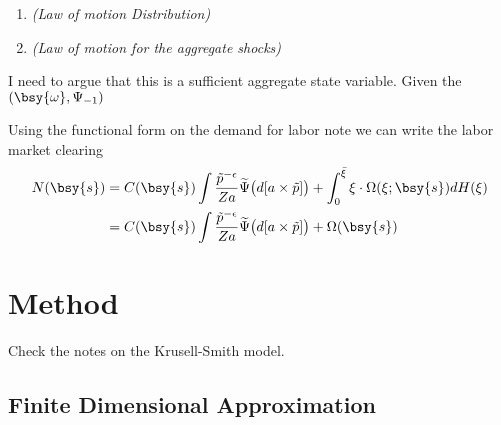 \documentclass[a4paper,10pt]{article}  %
\begin{document}
\begin{equil}
\begin{enumerate}
   \item \emph{(Law of motion Distribution)}

   
   \item \emph{(Law of motion for the aggregate shocks)}
\end{enumerate}
\end{equil} \normalsize

I need to argue that this is a sufficient aggregate state variable. Given the $ (\bsy{\omega}, \Psi_{-1} ) $ 

Using the functional form on the demand for labor note we can write the labor market clearing
\begin{equation}
   \label{eq:labor_market02}
   \begin{split}
      N(\bsy{s}) & = C(\bsy{s}) \int \frac{ \tilde{p}^{-\epsilon} }{Za} \widetilde{\Psi}\big( d[a \times \tilde{p}] \big) + 
             \int_0^{ \bar{\xi} } \xi \cdot \Omega(\xi; \bsy{s} ) dH(\xi) \\
      & = C(\bsy{s}) \int \frac{ \tilde{p}^{-\epsilon} }{Za} \widetilde{\Psi}\big( d[a \times \tilde{p}] \big) + \Omega(\bsy{s})
   \end{split}
\end{equation}



\newpage 
\section{Method} %
\label{sec:method}

Check the notes on the Krusell-Smith model.

\subsection{Finite Dimensional Approximation} %
\label{sub:finite_dimensional_approximation}
\end{document}
